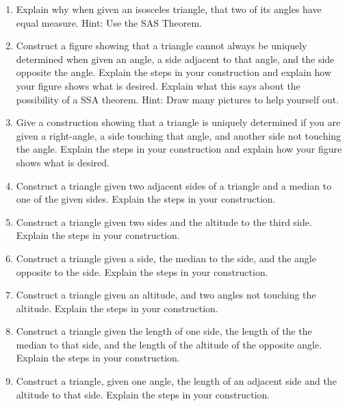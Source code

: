 \begin{enumerate}
\item Explain why when given an isosceles triangle, that two
  of its angles have equal measure. Hint: Use the SAS Theorem.


\item Construct a figure showing that a triangle cannot always be
  uniquely determined when given an angle, a side adjacent to that
  angle, and the side opposite the angle. Explain the steps in your
  construction and explain how your figure shows what is
  desired. Explain what this says about the possibility of a SSA
  theorem.  Hint: Draw many pictures to help yourself out.

\item Give a construction showing that a triangle is uniquely
  determined if you are given a right-angle, a side touching that
  angle, and another side not touching the angle. Explain the steps in
  your construction and explain how your figure shows what is desired.

\item Construct a triangle given two adjacent sides of a triangle and
  a median to one of the given sides. Explain the steps in your
  construction.

\item Construct a triangle given two sides and the altitude to the
  third side. Explain the steps in your construction.

\item Construct a triangle given a side, the median to the side, and
  the angle opposite to the side. Explain the steps in your
  construction.



\item Construct a triangle given an altitude, and two angles not
  touching the altitude. Explain the steps in your construction.

\item Construct a triangle given the length of one side, the length of
  the the median to that side, and the length of the altitude of the
  opposite angle. Explain the steps in your construction.

\item Construct a triangle, given one angle, the length of an adjacent
  side and the altitude to that side. Explain the steps in your
  construction.


\end{enumerate}
